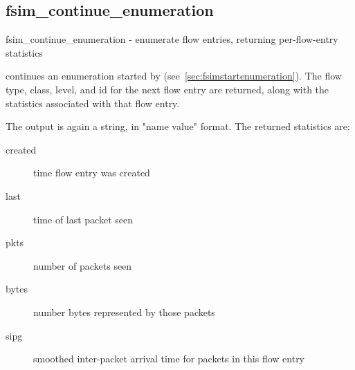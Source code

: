 \documentclass{article}
\begin{document}
\subsection{fsim\_continue\_enumeration}
\begin{description}

\NAME fsim\_continue\_enumeration - enumerate flow entries, returning
per-flow-entry statistics

\SYNOPSIS {}

\DESCRIPTION

 continues an enumeration started by
 (see~\ref{sec:fsimstartenumeration}).
The flow type, class, level, and id for the next flow entry are
returned, along with the statistics associated with that flow entry.

The output is again a string, in "name value" format.  The returned
statistics are:
\begin{description}
\item[created] time flow entry was created
\item[last] time of last packet seen
\item[pkts] number of packets seen
\item[bytes] number bytes represented by those packets
\item[sipg] smoothed inter-packet arrival time for packets in this flow
entry
\end{description}

\end{description}
\end{document}
